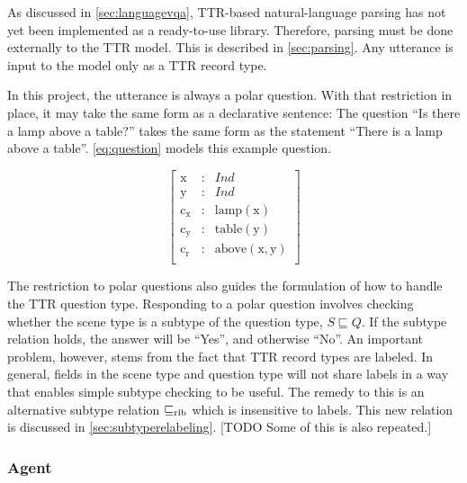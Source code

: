 
As discussed in \autoref{sec:languagevqa}, TTR-based natural-language parsing has not yet been implemented as a ready-to-use library.
Therefore, parsing must be done externally to the TTR model.
This is described in \autoref{sec:parsing}.
Any utterance is input to the model only as a TTR record type.

In this project, the utterance is always a polar question.
With that restriction in place, it may take the same form as a declarative sentence:
The question ``Is there a lamp above a table?'' takes the same form as the statement ``There is a lamp above a table''.
\autoref{eq:question} models this example question.

\begin{equation}\label{eq:question}
\left[\begin{array}{rcl}
    \text{x} &:& Ind \\
    \text{y} &:& Ind \\
    \text{c}_\text{x} &:& \text{lamp}(\text{x}) \\
    \text{c}_\text{y} &:& \text{table}(\text{y}) \\
    \text{c}_\text{r} &:& \text{above}(\text{x}, \text{y}) \\
    \end{array}\right]
\end{equation}

The restriction to polar questions also guides the formulation of how to handle the TTR question type.
Responding to a polar question involves checking whether the scene type is a subtype of the question type, $S \sqsubseteq Q$.
If the subtype relation holds, the answer will be ``Yes'', and otherwise ``No''.
An important problem, however, stems from the fact that TTR record types are labeled.
In general, fields in the scene type and question type will not share labels in a way that enables simple subtype checking to be useful.
The remedy to this is an alternative subtype relation $\mathrel{\sqsubseteq_\text{rlb}}$ which is insensitive to labels.
This new relation is discussed in \autoref{sec:subtyperelabeling}.
[TODO Some of this is also repeated.]



\subsubsection{Agent}
\label{sec:agent}

